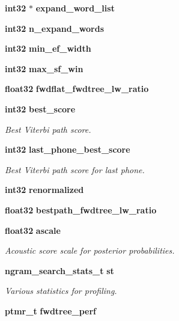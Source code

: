 \begin{DoxyCompactItemize}
\item 
{\bf int32} $\ast$ {\bfseries expand\-\_\-word\-\_\-list}\label{structngram__search__s_a4fadd755f8823c07dc5ab52f1b6d403d}

\item 
{\bf int32} {\bfseries n\-\_\-expand\-\_\-words}\label{structngram__search__s_a8a9999b6557b7c98dc03191a2d117eae}

\item 
{\bf int32} {\bfseries min\-\_\-ef\-\_\-width}\label{structngram__search__s_a88877b4dc14e04a6545c89668d8fcffc}

\item 
{\bf int32} {\bfseries max\-\_\-sf\-\_\-win}\label{structngram__search__s_a40659238fc506f7a3205eb080837008a}

\item 
{\bf float32} {\bfseries fwdflat\-\_\-fwdtree\-\_\-lw\-\_\-ratio}\label{structngram__search__s_a5772dec76068e162cebbae9f0f474aa6}

\item 
{\bf int32} {\bf best\-\_\-score}
\begin{DoxyCompactList}\small\item\em \-Best \-Viterbi path score. \end{DoxyCompactList}\item 
{\bf int32} {\bf last\-\_\-phone\-\_\-best\-\_\-score}
\begin{DoxyCompactList}\small\item\em \-Best \-Viterbi path score for last phone. \end{DoxyCompactList}\item 
{\bf int32} {\bfseries renormalized}\label{structngram__search__s_abf5988b55e39ff07d65edf61086a69da}

\item 
{\bf float32} {\bfseries bestpath\-\_\-fwdtree\-\_\-lw\-\_\-ratio}\label{structngram__search__s_a99114235f6ae8bc6d7c5849465499633}

\item 
{\bf float32} {\bf ascale}
\begin{DoxyCompactList}\small\item\em \-Acoustic score scale for posterior probabilities. \end{DoxyCompactList}\item 
{\bf ngram\-\_\-search\-\_\-stats\-\_\-t} {\bf st}
\begin{DoxyCompactList}\small\item\em \-Various statistics for profiling. \end{DoxyCompactList}\item 
{\bf ptmr\-\_\-t} {\bfseries fwdtree\-\_\-perf}\label{structngram__search__s_af51ec91c4ea052252542a4ec395484d7}


\end{DoxyCompactItemize}
